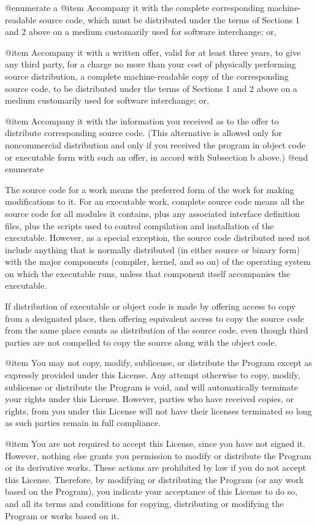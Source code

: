 @enumerate a
@item
Accompany it with the complete corresponding machine-readable
source code, which must be distributed under the terms of Sections
1 and 2 above on a medium customarily used for software interchange; or,

@item
Accompany it with a written offer, valid for at least three
years, to give any third party, for a charge no more than your
cost of physically performing source distribution, a complete
machine-readable copy of the corresponding source code, to be
distributed under the terms of Sections 1 and 2 above on a medium
customarily used for software interchange; or,

@item
Accompany it with the information you received as to the offer
to distribute corresponding source code.  (This alternative is
allowed only for noncommercial distribution and only if you
received the program in object code or executable form with such
an offer, in accord with Subsection b above.)
@end enumerate

The source code for a work means the preferred form of the work for
making modifications to it.  For an executable work, complete source
code means all the source code for all modules it contains, plus any
associated interface definition files, plus the scripts used to
control compilation and installation of the executable.  However, as a
special exception, the source code distributed need not include
anything that is normally distributed (in either source or binary
form) with the major components (compiler, kernel, and so on) of the
operating system on which the executable runs, unless that component
itself accompanies the executable.

If distribution of executable or object code is made by offering
access to copy from a designated place, then offering equivalent
access to copy the source code from the same place counts as
distribution of the source code, even though third parties are not
compelled to copy the source along with the object code.

@item
You may not copy, modify, sublicense, or distribute the Program
except as expressly provided under this License.  Any attempt
otherwise to copy, modify, sublicense or distribute the Program is
void, and will automatically terminate your rights under this License.
However, parties who have received copies, or rights, from you under
this License will not have their licenses terminated so long as such
parties remain in full compliance.

@item
You are not required to accept this License, since you have not
signed it.  However, nothing else grants you permission to modify or
distribute the Program or its derivative works.  These actions are
prohibited by law if you do not accept this License.  Therefore, by
modifying or distributing the Program (or any work based on the
Program), you indicate your acceptance of this License to do so, and
all its terms and conditions for copying, distributing or modifying
the Program or works based on it.

